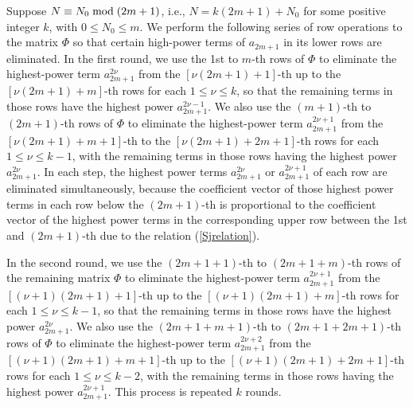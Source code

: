 \documentclass[amsmath,amssymb]{revtex4}
\begin{document}
Suppose $N\equiv N_{0} \hspace{0.1cm} \mbox{mod} \hspace{0.1cm} (2m+1)$, i.e., $N=k(2m+1)+N_0$ for some positive integer $k$, with $0\le N_0\le m$. We perform the following series of row operations to the matrix $\Phi$ so that certain high-power terms of $a_{2m+1}$ in its lower rows are eliminated. In the first round, we use the 1st to $m$-th rows of $\Phi$ to eliminate the highest-power term $a_{2m+1}^{2\nu}$ from the $[\nu (2m+1) +1]$-th up to the $[\nu (2m+1) +m]$-th rows for each $1\le \nu \le k$, so that the remaining terms in those rows have the highest power $a_{2m+1}^{2\nu-1}$. We also use the $(m+1)$-th to $(2m+1)$-th rows of $\Phi$ to eliminate the highest-power term $a_{2m+1}^{2\nu+1}$ from the $[\nu (2m+1) +m+1]$-th to the $[\nu (2m+1) +2m+1]$-th rows for each $1\le \nu \le k-1$, with the remaining terms in those rows having the highest power $a_{2m+1}^{2\nu}$.
In each step, the highest power terms $a_{2m+1}^{2\nu}$ or $a_{2m+1}^{2\nu+1}$ of each row are eliminated simultaneously, because the coefficient vector of those highest power terms in each row below the $(2m+1)$-th is proportional to the coefficient vector of the highest power terms in the corresponding upper row between the 1st and $(2m+1)$-th due to the relation (\ref{Sjrelation}).

In the second round, we use the $(2m+1+1)$-th to $(2m+1+m)$-th rows of the remaining matrix $\Phi$ to eliminate the highest-power term $a_{2m+1}^{2\nu+1}$ from the $[(\nu+1)(2m+1)+1]$-th up to the $[(\nu+1)(2m+1)+m]$-th rows for each $1\le \nu \le k-1$, so that the remaining terms in those rows have the highest power $a_{2m+1}^{2\nu}$. We also use the $(2m+1+m+1)$-th to $(2m+1+2m+1)$-th rows of $\Phi$ to eliminate the highest-power term $a_{2m+1}^{2\nu+2}$ from the $[(\nu+1)(2m+1) +m+1]$-th up to the $[(\nu+1)(2m+1) +2m+1]$-th rows for each $1\le \nu \le k-2$, with the remaining terms in those rows having the highest power $a_{2m+1}^{2\nu+1}$. This process is repeated $k$ rounds.
\end{document}
